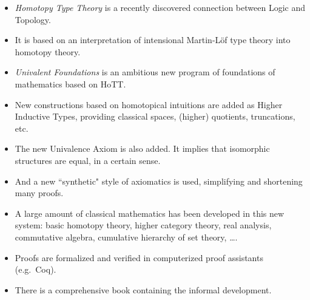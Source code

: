 \documentclass[11pt]{article}
\begin{document}
\begin{itemize}
\item \emph{Homotopy Type Theory} is a recently discovered connection between Logic and Topology.  
\item It is based on an interpretation of intensional Martin-L\"of type theory into homotopy theory.
\item \emph{Univalent Foundations} is an ambitious new program of foundations of mathematics based on HoTT.  
\item New constructions based on homotopical intuitions are added as Higher Inductive Types, providing classical spaces, (higher) quotients, truncations, etc.
\item The new Univalence Axiom is also added.  It implies that isomorphic structures are equal, in a certain sense.

\item And a new ``synthetic" style of axiomatics is used, simplifying and shortening  many proofs.
\item A large amount of classical mathematics has been developed in this new system:  basic homotopy theory, higher category theory, real analysis, commutative algebra, cumulative hierarchy of set theory, \dots .
\item Proofs are formalized and verified in computerized proof assistants (e.g.\ Coq).
\item There is a comprehensive book containing the informal development.
\end{itemize}

%
%
%
%
%
\end{document}
